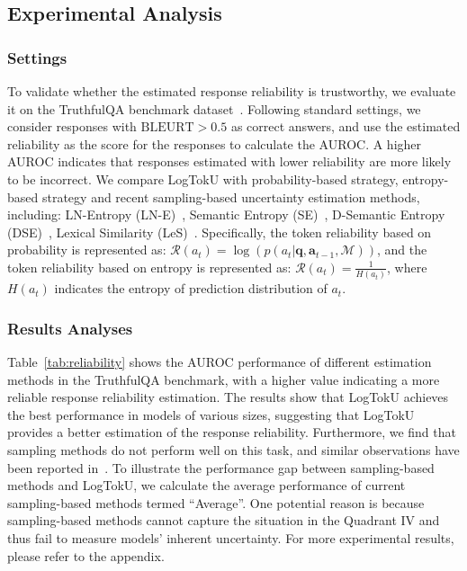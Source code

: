 \subsection{Experimental Analysis}
\subsubsection{Settings}
To validate whether the estimated response reliability is trustworthy, we evaluate it on the TruthfulQA benchmark dataset~\cite{lin2021truthfulqa}. Following standard settings, we consider responses with $\text{BLEURT} > 0.5$ as correct answers, and use the estimated reliability as the score for the responses to calculate the AUROC. A higher AUROC indicates that responses estimated with lower reliability are more likely to be incorrect. We compare LogTokU with probability-based strategy, entropy-based strategy and recent sampling-based uncertainty estimation methods, including: LN-Entropy (LN-E)~\cite{malinin2021uncertainty}, Semantic Entropy (SE)~\cite{kuhn2023semantic}, D-Semantic Entropy (DSE)~\cite{kuhn2023semantic}, Lexical Similarity (LeS)~\cite{lin2024generating}. Specifically, the token reliability based on probability is represented as: $\mathcal{R}(a_t)=\log \left(p(a_t|\bm{q},\bm{a}_{t-1},\mathcal{M})\right)$, and the token reliability based on entropy is represented as: $\mathcal{R}(a_t)=\frac{1}{H(a_t)}$, where $H(a_t)$ indicates the entropy of prediction distribution of $a_t$.


\subsubsection{Results Analyses}

Table~\ref{tab:reliability} shows the AUROC performance of different estimation methods in the TruthfulQA benchmark, with a higher value indicating a more reliable response reliability estimation. The results show that LogTokU achieves the best performance in models of various sizes, suggesting that LogTokU provides a better estimation of the response reliability. Furthermore, we find that sampling methods do not perform well on this task, and similar observations have been reported in~\cite{xiong2024efficient}. To illustrate the performance gap between sampling-based methods and LogTokU, we calculate the average performance of current sampling-based methods termed ``Average''. One potential reason is because sampling-based methods cannot capture the situation in the Quadrant IV and thus fail to measure models' inherent uncertainty. For more experimental results, please refer to the appendix.
